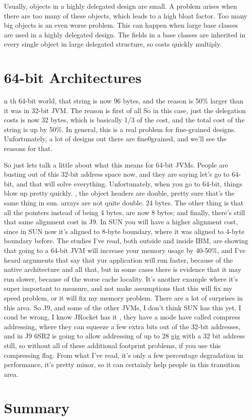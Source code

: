 \documentclass{book}
\theoremstyle{definition}
\begin{document}
Usually, objects in a highly delegated design are small. A problem arises when there are too many of these objects, which leads to a high bloat factor.  Too many big objects is an even worse problem. This can happen when large base classes are used in a highly delegated design. The fields in a base classes are inherited in every single object in large delegated structure, so costs quickly multiply.
\section{64-bit Architectures}

n th 64-bit world, that string is now 96 bytes, and the reason is 50\% larger than it was in 32-bit JVM. The reason is first of all So in this case, just the delegation costs is now 32 bytes, which is basically 1/3 of the cost, and the total cost of the string is up by 50\%.  In general, this is a real problem for fine-grained designs. Unfortunately, a lot of designs out there are fine0grained, and we'll see the reasons for that. 


So just lets talk a little about what this means for 64-bit JVMs. People are busting out of this 32-bit address space now, and they are saying let's go to 64-bit, and that will solve everything. Unfortunately, when you go to 64-bit, things blow up pretty quickly. , the object headers are double, pretty sure that's the same thing in sun. arrays are not quite double. 24 bytes. The other thing is that all the pointers instead of being 4 bytes, are now 8 bytes; and finally, there's still that same alignment cost in J9. In SUN you will have a higher alignment cost, since in SUN now it's aligned to 8-byte boundary, where it was aligned to 4-byte boundary before.  The studies I've read, both outside and inside IBM, are showing that going to a 64-bit JVM will increase your memory usage by 40-50\%, and I've heard arguments that say that yur application will run faster, because of the native architecture and all that,  but in some cases there is evidence that it may run slower, because of the worse cache locality. It's another example where it's super important to measure, and not make assumptions that this will fix my speed problem, or it will fix my memory problem. There are a lot of surprises in this area. So J9, and some of the other JVMs, I don't think SUN has this yet, I coud be wrong, I know JRocket has it , they have a mode have called compress addressing, where they can squeeze a few extra bits out of the 32-bit addresses, and in J9 6SR2 is going to allow addressing of up to 28 gig with a 32 bit address still, so without all of these additional footprint problems, if you use this compressing flag. From what I've read, it's only a few percentage degradation in performance, it's pretty minor, so it can certainly help people in this transition area.




\section{Summary}
\end{document}
